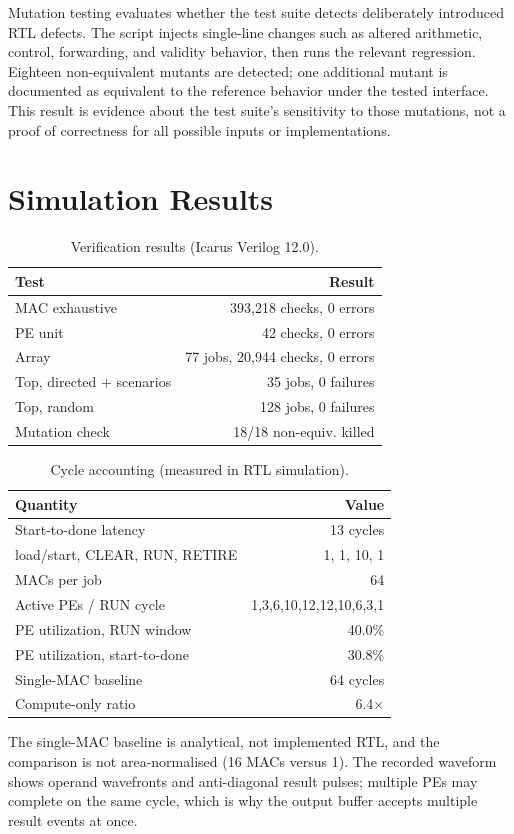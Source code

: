 \documentclass[conference]{IEEEtran}
\begin{document}
Mutation testing evaluates whether the test suite detects deliberately introduced RTL defects. The script injects
single-line changes such as altered arithmetic, control, forwarding, and validity behavior, then runs the relevant
regression. Eighteen non-equivalent mutants are detected; one additional mutant is documented as equivalent to the
reference behavior under the tested interface. This result is evidence about the test suite's sensitivity to those
mutations, not a proof of correctness for all possible inputs or implementations.

\section{Simulation Results}
\begin{table}[t]\centering\caption{Verification results (Icarus Verilog 12.0).}\label{tab:ver}
\begin{tabular}{@{}lr@{}}\toprule
Test & Result\\\midrule
MAC exhaustive & 393{,}218 checks, 0 errors\\
PE unit & 42 checks, 0 errors\\
Array & 77 jobs, 20{,}944 checks, 0 errors\\
Top, directed + scenarios & 35 jobs, 0 failures\\
Top, random & 128 jobs, 0 failures\\
Mutation check & 18/18 non-equiv. killed\\\bottomrule
\end{tabular}\end{table}
\begin{table}[t]\centering\caption{Cycle accounting (measured in RTL simulation).}\label{tab:cyc}
\begin{tabular}{@{}lr@{}}\toprule
Quantity & Value\\\midrule
Start-to-done latency & 13 cycles\\
\quad load/start, CLEAR, RUN, RETIRE & 1, 1, 10, 1\\
MACs per job & 64\\
Active PEs / RUN cycle & 1,3,6,10,12,12,10,6,3,1\\
PE utilization, RUN window & 40.0\%\\
PE utilization, start-to-done & 30.8\%\\
Single-MAC baseline & 64 cycles\\
Compute-only ratio & 6.4$\times$\\\bottomrule
\end{tabular}\end{table}
The single-MAC baseline is analytical, not implemented RTL, and the comparison is not area-normalised (16 MACs versus 1).
The recorded waveform shows operand wavefronts and anti-diagonal result pulses; multiple PEs may complete on the same
cycle, which is why the output buffer accepts multiple result events at once.
\end{document}
